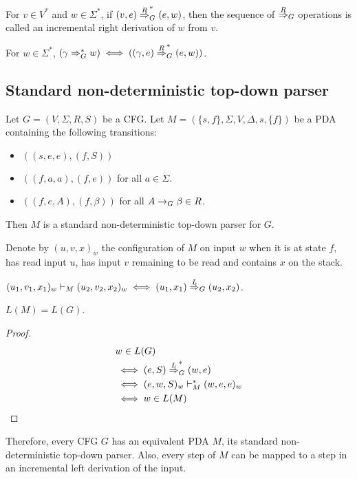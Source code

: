 For $v \in V^*$ and $w \in \Sigma^*$, if $(v, e) \overset{R}{\Rightarrow}_{G}^* (e, w)$,
then the sequence of $\overset{R}{\Rightarrow}_{G}$ operations
is called an incremental right derivation of $w$ from $v$.

\begin{theorem}
For $w \in \Sigma^*$,
$(\gamma \Rightarrow_{G}^* w) \iff ((\gamma, e) \overset{R}{\Rightarrow}_{G}^* (e, w))$.
\end{theorem}

\subsection{Standard non-deterministic top-down parser}

\begin{definition}
Let $G = (V, \Sigma, R, S)$ be a CFG.
Let $M = (\{s, f\}, \Sigma, V, \Delta, s, \{f\})$ be a PDA
containing the following transitions:
\begin{itemize}
\item $((s, e, e), (f, S))$
\item $((f, a, a), (f, e))$ for all $a \in \Sigma$.
\item $((f, e, A), (f, \beta))$ for all $A \rightarrow_{G} \beta \in R$.
\end{itemize}
Then $M$ is a standard non-deterministic top-down parser for $G$.
\end{definition}

Denote by $(u, v, x)_w$ the configuration of $M$ on input $w$ when it is at state $f$,
has read input $u$, has input $v$ remaining to be read and contains $x$ on the stack.

\begin{theorem}
$(u_1, v_1, x_1)_w \vdash_M (u_2, v_2, x_2)_w \iff (u_1, x_1) \overset{L}{\Rightarrow}_{G} (u_2, x_2)$.
\end{theorem}
\begin{theorem}$L(M) = L(G)$.\end{theorem}
\begin{proof}
\begin{align*}
& w \in L(G)
\\ &\iff (e, S) \overset{L}{\Rightarrow}_{G}^* (w, e)
\\ &\iff (e, w, S)_w \vdash_M^* (w, e, e)_w
\\ &\iff w \in L(M)
\end{align*}
\end{proof}

Therefore, every CFG $G$ has an equivalent PDA $M$, its standard non-deterministic top-down parser.
Also, every step of $M$ can be mapped to a step in an incremental left derivation of the input.

